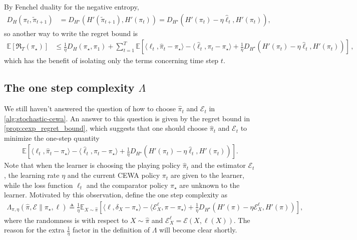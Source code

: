 \documentclass{article}
\theoremstyle{plain}
\theoremstyle{definition}
\theoremstyle{plain}
\newcommand{\Reg}{\mathfrak{R}}
\newcommand{\E}{\mathbb E}
\newcommand{\cE}{\mathcal E}
\newcommand{\cewaalg}{\textsf{CEWA}\xspace}
\newcommand{\hf}{\hat{\ell}\xspace}
\begin{document}
By Fenchel duality for the negative entropy,
\begin{align}
    D_H(\pi_t,\tilde{\pi}_{t+1})
     & =
    D_{H^\star}
    \left(
    H'(\tilde{\pi}_{t+1}),
    H'(\pi_t)
    \right) =
    D_{H^\star}
    \left(
    H'(\pi_t)-\eta \hf_t,
    H'(\pi_t)
    \right),
\end{align}
so another way to write the regret bound is
\begin{align}
    \E[\Reg_T(\pi_\star)]
     & \leq
    \frac{1}{\eta}D_H(\pi_\star,\pi_1)
    +
    \sum_{t=1}^T
    \E\left[
        \langle \ell_t,\hat{\pi}_t-\pi_\star\rangle
        -
        \langle \hf_t,\pi_t-\pi_\star\rangle
        +
        \frac{1}{\eta}
        D_{H^\star}
        \left(
        H'(\pi_t)-\eta \hf_t,
        H'(\pi_t)
        \right)
        \right]\,,\label{eq:regret_bound_cexp_with_Bregman_divergence}
\end{align}
which has the benefit of isolating only the terms concerning time step $t$.

\subsection{The one step complexity \texorpdfstring{$\Lambda$}{Lambda}}
We still haven't answered the question of how to choose $\hat{\pi}_t$ and $\cE_t$ in \cref{alg:stochastic-cewa}.
An answer to this question is given by the regret bound in \cref{prop:cexp_regret_bound}, which suggests that one should choose $\hat{\pi}_t$ and $\cE_t$ to minimize the one-step quantity
\begin{align}
    \E\left[
        \langle \ell_t,\hat{\pi}_t-\pi_\star\rangle
        -
        \langle \hf_t,\pi_t-\pi_\star\rangle
        +
        \frac{1}{\eta}
        D_{H^\star}
        \left(
        H'(\pi_t)-\eta \hf_t,
        H'(\pi_t)
        \right)
        \right].
\end{align}
Note that when the learner is choosing the playing policy $\hat{\pi}_t$ and the estimator $\cE_t$, the learning rate $\eta$ and the current \cewaalg policy $\pi_t$ are given to the learner, while the loss function $\ell_t$ and the comparator policy $\pi_\star$ are unknown to the learner.
Motivated by this observation, define the one step complexity as
\begin{align}
    \Lambda_{\pi,\eta}(\hat{\pi},\cE \| \pi_\star, \ell)
    \triangleq
    \frac{1}{\eta}
    \E_{X\sim\hat{\pi}}\left[
        \langle \ell,\delta_X-\pi_\star\rangle
        -
        \langle \cE_X^\ell,\pi-\pi_\star\rangle
        +
        \frac{1}{\eta}
        D_{H^\star}
        \left(
        H'(\pi)-\eta \cE_X^\ell,
        H'(\pi)
        \right)
        \right],
\end{align}
where the randomness is with respect to $X \sim \hat{\pi}$ and $\cE_X^\ell = \cE(X,\ell(X))$.
The reason for the extra $\frac{1}{\eta}$ factor in the definition of $\Lambda$ will become clear shortly.
\end{document}
